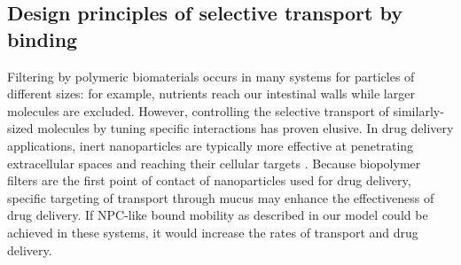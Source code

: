 \subsection{Design principles of selective transport by binding}

Filtering by polymeric biomaterials occurs in many systems for
particles of different sizes: for example, nutrients reach our
intestinal walls while larger molecules are excluded.  However,
controlling the selective transport of similarly-sized molecules by
tuning specific interactions has proven elusive. In drug delivery
applications, inert nanoparticles are typically more effective at penetrating
extracellular spaces and reaching their cellular targets
\cite{witten17}. Because biopolymer filters are the first point of
contact of nanoparticles used for drug delivery, specific targeting of
transport through mucus may enhance the effectiveness of drug
delivery. If NPC-like bound mobility as described in our model could
be achieved in these systems, it would increase the rates of
transport and drug delivery. 
